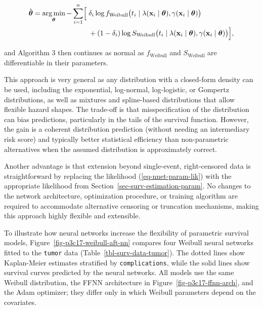 \documentclass[
  letterpaper,
  krantz2]{style/krantz}
\begin{document}
\[
\begin{aligned}
\hat{\boldsymbol{\theta}} = \mathop{\mathrm{arg\,min}}_{\boldsymbol{\theta}} -\sum_{i=1}^{n} \Bigl[\;&\delta_i \log f_{\operatorname{Weibull}}\bigl(t_i \mid \lambda(\mathbf{x}_i \mid \boldsymbol{\theta}), \gamma(\mathbf{x}_i \mid \boldsymbol{\theta})\bigr) \\
&+ (1 - \delta_i) \log S_{\operatorname{Weibull}}\bigl(t_i \mid \lambda(\mathbf{x}_i \mid \boldsymbol{\theta}), \gamma(\mathbf{x}_i \mid \boldsymbol{\theta})\bigr)\Bigr],
\end{aligned}
\]

and Algorithm 3 then continues as normal as
\(f_{\operatorname{Weibull}}\) and \(S_{\operatorname{Weibull}}\) are
differentiable in their parameters.

This approach is very general as any distribution with a closed-form
density can be used, including the exponential, log-normal,
log-logistic, or Gompertz distributions, as well as mixtures and
spline-based distributions that allow flexible hazard shapes. The
trade-off is that misspecification of the distribution can bias
predictions, particularly in the tails of the survival function.
However, the gain is a coherent distribution prediction (without needing
an intermediary risk score) and typically better statistical efficiency
than non-parametric alternatives when the assumed distribution is
approximately correct.

Another advantage is that extension beyond single-event, right-censored
data is straightforward by replacing the likelihood
(\ref{eq-nnet-param-lik}) with the appropriate likelihood from
Section~\ref{sec-surv-estimation-param}. No changes to the network
architecture, optimization procedure, or training algorithm are required
to accommodate alternative censoring or truncation mechanisms, making
this approach highly flexible and
extensible.

To illustrate how neural networks increase the flexibility of parametric
survival models, Figure~\ref{fig-p3c17-weibull-aft-nn} compares four
Weibull neural networks fitted to the \texttt{tumor} data
(Table~\ref{tbl-surv-data-tumor}). The dotted lines show Kaplan-Meier
estimates stratified by \texttt{complications}, while the solid lines
show survival curves predicted by the neural networks. All models use
the same Weibull distribution, the FFNN architecture in
Figure~\ref{fig-p3c17-ffnn-arch}, and the Adam optimizer; they differ
only in which Weibull parameters depend on the covariates.
\end{document}
